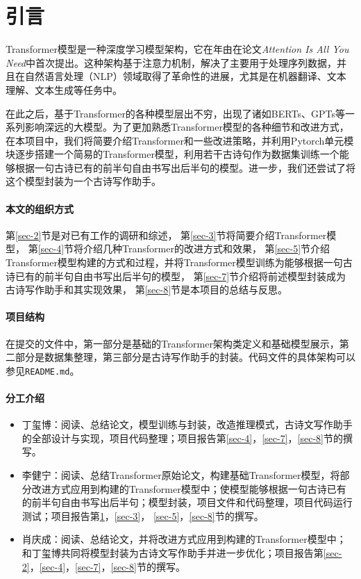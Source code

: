 \section{引言}\label{sec-1}

Transformer模型是一种深度学习模型架构，它在\citeyear{vaswaniAttentionAllYou2023}年由\citeauthor{vaswaniAttentionAllYou2023}在论文\textit{Attention Is All You Need}中首次提出\citep{vaswaniAttentionAllYou2023}。这种架构基于注意力机制，解决了主要用于处理序列数据，并且在自然语言处理（NLP）领域取得了革命性的进展，尤其是在机器翻译、文本理解、文本生成等任务中。

在此之后，基于Transformer的各种模型层出不穷，出现了诸如BERTs、GPTs等一系列影响深远的大模型。为了更加熟悉Transformer模型的各种细节和改进方式，在本项目中，我们将简要介绍Transformer和一些改进策略，并利用Pytorch单元模块逐步搭建一个简易的Transformer模型，利用若干古诗句作为数据集训练一个能够根据一句古诗已有的前半句自由书写出后半句的模型。进一步，我们还尝试了将这个模型封装为一个古诗写作助手。

\paragraph{本文的组织方式} 
第\ref{sec-2}节是对已有工作的调研和综述，
第\ref{sec-3}节将简要介绍Transformer模型，
第\ref{sec-4}节将介绍几种Transformer的改进方式和效果，
第\ref{sec-5}节介绍Transformer模型构建的方式和过程，并将Transformer模型训练为能够根据一句古诗已有的前半句自由书写出后半句的模型，
第\ref{sec-7}节介绍将前述模型封装成为古诗写作助手和其实现效果，
第\ref{sec-8}节是本项目的总结与反思。

\paragraph{项目结构}

在提交的文件中，第一部分是基础的Transformer架构类定义和基础模型展示，第二部分是数据集整理，第三部分是古诗写作助手的封装。代码文件的具体架构可以参见\texttt{README.md}。

\paragraph{分工介绍}
\begin{itemize}
    \item 丁玺博：阅读、总结论文，模型训练与封装，改造推理模式，古诗文写作助手的全部设计与实现，项目代码整理；项目报告第\ref{sec-4}，\ref{sec-7}，\ref{sec-8}节的撰写。
    \item 李健宁：阅读、总结Transformer原始论文\cite{vaswaniAttentionAllYou2023}，构建基础Transformer模型，将部分改进方式应用到构建的Transformer模型中；使模型能够根据一句古诗已有的前半句自由书写出后半句；模型封装，项目文件和代码整理，项目代码运行测试；项目报告第\ref{sec-1}，\ref{sec-3}， \ref{sec-5}，\ref{sec-8}节的撰写。
    \item 肖庆成：阅读、总结论文，并将改进方式应用到构建的Transformer模型中；和丁玺博共同将模型封装为古诗文写作助手并进一步优化；项目报告第\ref{sec-2}，\ref{sec-4}，\ref{sec-7}，\ref{sec-8}节的撰写。
\end{itemize}



